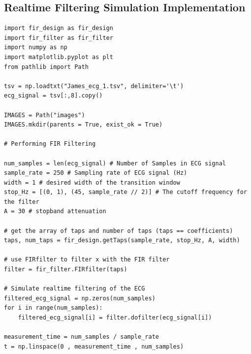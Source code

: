 \documentclass[8pt]{extarticle}
\begin{document}
\subsection{Realtime Filtering Simulation Implementation}
\begin{verbatim}
import fir_design as fir_design
import fir_filter as fir_filter
import numpy as np
import matplotlib.pyplot as plt
from pathlib import Path

tsv = np.loadtxt("James_ecg_1.tsv", delimiter='\t')
ecg_signal = tsv[:,8].copy()

IMAGES = Path("images")
IMAGES.mkdir(parents = True, exist_ok = True)

# Performing FIR Filtering

num_samples = len(ecg_signal) # Number of Samples in ECG signal
sample_rate = 250 # Sampling rate of ECG signal (Hz)
width = 1 # desired width of the transition window
stop_Hz = [(0, 1), (45, sample_rate // 2)] # The cutoff frequency for the filter
A = 30 # stopband attenuation

# get the array of taps and number of taps (taps == coefficients)
taps, num_taps = fir_design.getTaps(sample_rate, stop_Hz, A, width)

# use FIRfilter to filter x with the FIR filter
filter = fir_filter.FIRfilter(taps)

# Simulate realtime filtering of the ECG
filtered_ecg_signal = np.zeros(num_samples)
for i in range(num_samples):
    filtered_ecg_signal[i] = filter.dofilter(ecg_signal[i])

measurement_time = num_samples / sample_rate
t = np.linspace(0 , measurement_time , num_samples)
\end{verbatim}
\end{document}
